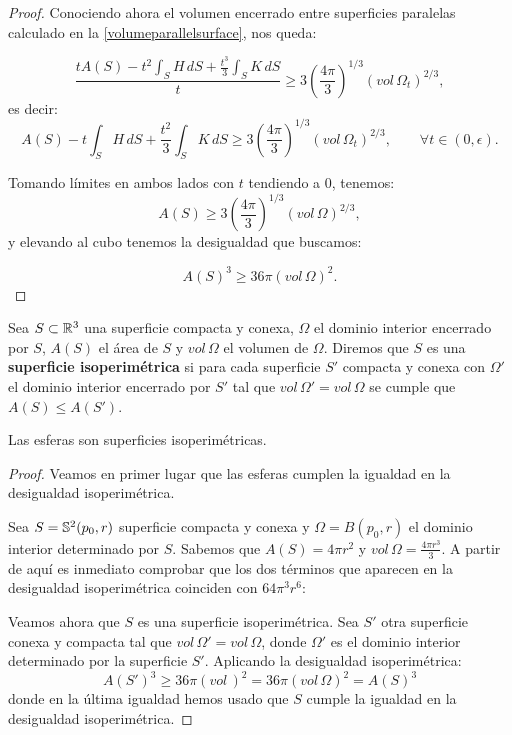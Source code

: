 \begin{proof}
Conociendo ahora el volumen encerrado entre superficies paralelas calculado en la \autoref{volumeparallelsurface}, nos queda:

\begin{equation*}
    \frac{tA(S) - t^2\int_S H \, dS + \frac{t^3}{3}\int_S K \, dS}{t} \geq 3 \left( \frac{4\pi}{3} \right)^{1/3} (vol \, \Omega_t)^{2/3},
\end{equation*}
%
es decir:
%
\begin{equation*}
    A(S) - t\int_S H \, dS + \frac{t^2}{3}\int_S K \, dS \geq 3 \left( \frac{4\pi}{3} \right)^{1/3} (vol \, \Omega_t)^{2/3}, \qquad \forall t \in (0,\epsilon).
\end{equation*}

Tomando límites en ambos lados con $t$ tendiendo a $0$, tenemos:
%
\begin{equation*}
    A(S) \geq 3 \left( \frac{4\pi}{3} \right)^{1/3} (vol \, \Omega)^{2/3},
\end{equation*}
%
y elevando al cubo tenemos la desigualdad que buscamos:

\begin{equation*}
    A(S)^3 \geq 36\pi(vol \, \Omega)^2.
\end{equation*}
\end{proof}

\begin{definition}
Sea $S \subset \mathbb{R}^3$ una superficie compacta y conexa, $\Omega$ el dominio interior encerrado por $S$, $A(S)$ el área de $S$ y $vol \, \Omega$ el volumen de $\Omega$. Diremos que $S$ es una \textbf{superficie isoperimétrica} si para cada superficie $S'$ compacta y conexa con $\Omega'$ el dominio interior encerrado por $S'$ tal que $vol \, \Omega' = vol \, \Omega$ se cumple que $A(S) \leq A(S')$.
\end{definition}

\begin{proposition}\label{prop:spheresasisoperimetricsurfaces}
Las esferas son superficies isoperimétricas.
\end{proposition}
\begin{proof}
Veamos en primer lugar que las esferas cumplen la igualdad en la desigualdad isoperimétrica.

Sea $S=\mathbb{S}^2(p_0,r)$ superficie compacta y conexa y $\Omega = B(p_0,r)$ el dominio interior determinado por $S$. Sabemos que $A(S)=4\pi r^2$ y $vol \, \Omega = \frac{4\pi r^3}{3}$. A partir de aquí es inmediato comprobar que los dos términos que aparecen en la desigualdad isoperimétrica coinciden con $64\pi^3r^6$:

Veamos ahora que $S$ es una superficie isoperimétrica. Sea $S'$ otra superficie conexa y compacta tal que $vol \, \Omega' = vol \, \Omega$, donde $\Omega'$ es el dominio interior determinado por la superficie $S'$. Aplicando la desigualdad isoperimétrica:
%
\begin{equation*}
    A(S')^3 \geq 36\pi (vol \,)^2 = 36\pi (vol \, \Omega)^2 = A(S)^3 
\end{equation*}
%
donde en la última igualdad hemos usado que $S$ cumple la igualdad en la desigualdad isoperimétrica.
\end{proof}

